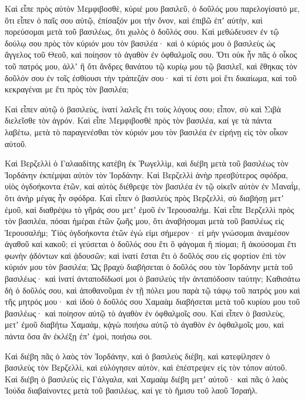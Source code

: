 {Καὶ εἶπε πρὸς αὐτὸν Μεμφιβοσθὲ, κύριέ μου βασιλεῦ, ὁ δοῦλός μου παρελογίσατό με, ὅτι εἶπεν ὁ παῖς σου αὐτῷ, ἐπίσαξόν μοι τὴν ὄνον, καὶ ἐπιβῶ ἐπʼ αὐτὴν, καὶ πορεύσομαι μετὰ τοῦ βασιλέως, ὅτι χωλὸς ὁ δοῦλός σου.
Καὶ μεθώδευσεν ἐν τῷ δούλῳ σου πρὸς τὸν κύριόν μου τὸν βασιλέα· καὶ ὁ κύριός μου ὁ βασιλεὺς ὡς ἄγγελος τοῦ Θεοῦ, καὶ ποίησον τὸ ἀγαθὸν ἐν ὀφθαλμοῖς σου.
Ὅτι οὐκ ἦν πᾶς ὁ οἶκος τοῦ πατρός μου, ἀλλʼ ἢ ὅτι ἄνδρες θανάτου τῷ κυρίῳ μου τῷ βασιλεῖ, καὶ ἔθηκας τὸν δοῦλόν σου ἐν τοῖς ἐσθίουσι τὴν τράπεζάν σου· καὶ τί ἐστι μοὶ ἔτι δικαίωμα, καὶ τοῦ κεκραγέναι με ἔτι πρὸς τὸν βασιλέα;
\par }{\PP {}Καὶ εἶπεν αὐτῷ ὁ βασιλεὺς, ἱνατί λαλεῖς ἔτι τοὺς λόγους σου; εἶπον, σὺ καὶ Σιβὰ διελεῖσθε τὸν ἀγρόν.
Καὶ εἶπε Μεμφιβοσθὲ πρὸς τὸν βασιλέα, καί γε τὰ πάντα λαβέτω, μετὰ τὸ παραγενέσθαι τὸν κύριόν μου τὸν βασιλέα ἐν εἰρήνῃ εἰς τὸν οἶκον αὐτοῦ.
\par }{\PP {}Καὶ Βερζελλὶ ὁ Γαλααδίτης κατέβη ἐκ Ῥωγελλὶμ, καὶ διέβη μετὰ τοῦ βασιλέως τὸν Ἰορδάνην ἐκπέμψαι αὐτὸν τὸν Ἰορδάνην.
Καὶ Βερζελλὶ ἀνὴρ πρεσβύτερος σφόδρα, υἱὸς ὀγδοήκοντα ἐτῶν, καὶ αὐτὸς διέθρεψε τὸν βασιλέα ἐν τῷ οἰκεῖν αὐτὸν ἐν Μαναῒμ, ὅτι ἀνὴρ μέγας ἦν σφόδρα.
Καὶ εἶπεν ὁ βασιλεὺς πρὸς Βερζελλὶ, σὺ διαβήσῃ μετʼ ἐμοῦ, καὶ διαθρέψω τὸ γῆράς σου μετʼ ἐμοῦ ἐν Ἱερουσαλήμ.
Καὶ εἶπε Βερζελλὶ πρὸς τὸν βασιλέα, πόσαι ἡμέραι ἐτῶν ζωῆς μου, ὅτι ἀναβήσομαι μετὰ τοῦ βασιλέως εἰς Ἱερουσαλήμ;
Υἱὸς ὀγδοήκοντα ἐτῶν ἐγώ εἰμι σήμερον· εἰ μὴν γνώσομαι ἀναμέσον ἀγαθοῦ καὶ κακοῦ; εἰ γεύσεται ὁ δοῦλός σου ἔτι ὃ φάγομαι ἢ πίομαι; ἢ ἀκούσομαι ἔτι φωνὴν ᾀδόντων καὶ ᾀδουσῶν; καὶ ἱνατί ἔσται ἔτι ὁ δοῦλός σου εἰς φορτίον ἐπὶ τὸν κύριόν μου τὸν βασιλέα;
Ὡς βραχὺ διαβήσεται ὁ δοῦλός σου τὸν Ἰορδάνην μετὰ τοῦ βασιλέως· καὶ ἱνατί ἀνταποδίδωσί μοι ὁ βασιλεὺς τὴν ἀνταπόδοσιν ταύτην;
Καθισάτω δὴ ὁ δοῦλός σου, καὶ ἀποθανοῦμαι ἐν τῇ πόλει μου παρὰ τῷ τάφῳ τοῦ πατρός μου καὶ τῆς μητρός μου· καὶ ἰδοὺ ὁ δοῦλός σου Χαμαὰμ διαβήσεται μετὰ τοῦ κυρίου μου τοῦ βασιλέως· καὶ ποίησον αὐτῷ τὸ ἀγαθὸν ἐν ὀφθαλμοῖς σου.
Καὶ εἶπεν ὁ βασιλεὺς, μετʼ ἐμοῦ διαβήτω Χαμαὰμ, κᾀγὼ ποιήσω αὐτῷ τὸ ἀγαθὸν ἐν ὀφθαλμοῖς μου, καὶ πάντα ὅσα ἂν ἐκλέξῃ ἐπʼ ἐμοὶ, ποιήσω σοι.
\par }{\PP {}Καὶ διέβη πᾶς ὁ λαὸς τὸν Ἰορδάνην, καὶ ὁ βασιλεὺς διέβη, καὶ κατεφίλησεν ὁ βασιλεὺς τὸν Βερζελλὶ, καὶ εὐλόγησεν αὐτὸν, καὶ ἐπέστρεψεν εἰς τὸν τόπον αὐτοῦ.
Καὶ διέβη ὁ βασιλεὺς εἰς Γάλγαλα, καὶ Χαμαὰμ διέβη μετʼ αὐτοῦ· καὶ πᾶς ὁ λαὸς Ἰούδα διαβαίνοντες μετὰ τοῦ βασιλέως, καί γε τὸ ἥμισυ τοῦ λαοῦ Ἰσραήλ.
}
